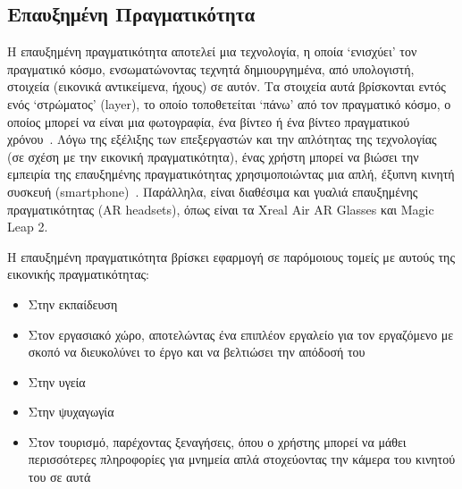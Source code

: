 \subsection{Επαυξημένη Πραγματικότητα}\label{subsec:augmentedReality}
Η επαυξημένη πραγματικότητα αποτελεί μια τεχνολογία, η οποία `ενισχύει' τον πραγματικό κόσμο, ενσωματώνοντας τεχνητά δημιουργημένα, από υπολογιστή, στοιχεία (εικονικά αντικείμενα, ήχους) σε αυτόν. Τα στοιχεία αυτά βρίσκονται εντός ενός `στρώματος' (layer), το οποίο τοποθετείται `πάνω' από τον πραγματικό κόσμο, ο οποίος μπορεί να είναι μια φωτογραφία, ένα βίντεο ή ένα βίντεο πραγματικού χρόνου~\cite{hosch_2020_augmented}\cite{carmigniani_2011_augmented}. Λόγω της εξέλιξης των επεξεργαστών και την απλότητας της τεχνολογίας (σε σχέση με την εικονική πραγματικότητα), ένας χρήστη μπορεί να βιώσει την εμπειρία της επαυξημένης πραγματικότητας χρησιμοποιώντας μια απλή, έξυπνη κινητή συσκευή (smartphone)~\cite{ko_2013_usability}. Παράλληλα, είναι διαθέσιμα και γυαλιά επαυξημένης πραγματικότητας (AR headsets), όπως είναι τα Xreal Air AR Glasses και Magic Leap 2.

Η επαυξημένη πραγματικότητα βρίσκει εφαρμογή σε παρόμοιους τομείς με αυτούς της εικονικής πραγματικότητας:
\begin{itemize}
    \item Στην εκπαίδευση~\cite{wu_2013_current}\cite{lee_2012_augmented}
    \item Στον εργασιακό χώρο, αποτελώντας ένα επιπλέον εργαλείο για τον εργαζόμενο με σκοπό να διευκολύνει το έργο και να βελτιώσει την απόδοσή του~\cite{kim_2016_augmented}\cite{funk_2017_working}\cite{pereira_2023_augmented}
    \item Στην υγεία~\cite{klinker_2019_digital}\cite{zhu_2015_design}\cite{gerup_2020_augmented}\cite{solbiati_2020_augmented}
    \item Στην ψυχαγωγία~\cite{hung_2021_a}
    \item Στον τουρισμό, παρέχοντας ξεναγήσεις, όπου ο χρήστης μπορεί να μάθει περισσότερες πληροφορίες για μνημεία απλά στοχεύοντας την κάμερα του κινητού του σε αυτά~\cite{yovcheva_2012_smartphone}\cite{kounavis_2012_enhancing}
\end{itemize} 

